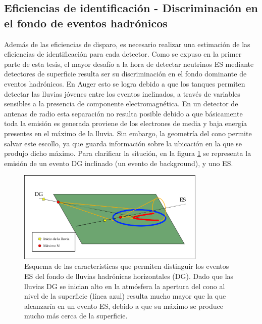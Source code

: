 	\clearpage
	\subsection{Eficiencias de identificaci\'on - Discriminaci\'on en el fondo de eventos hadr\'onicos}
	\label{sc:identificacionRadio}
	
	Adem\'as de las eficiencias de disparo, es necesario realizar una estimaci\'on de las eficiencias de identificaci\'on para cada detector.
	Como se expuso en la primer parte de esta tesis, el mayor desaf\'io a la hora de detectar neutrinos ES mediante detectores de superficie resulta ser su discriminaci\'on en el fondo dominante de eventos hadr\'onicos.
	En Auger esto se logra debido a que los tanques \cher{} permiten detectar las lluvias j\'ovenes entre los eventos inclinados, a trav\'es de variables sensibles a la presencia de componente electromagn\'etica.
	En un detector de antenas de radio esta separaci\'on no resulta posible debido a que b\'asicamente toda la emisi\'on es generada proviene de los electrones de media y baja energ\'ia presentes en el m\'aximo de la lluvia.
	Sin embargo, la geometr\'ia del cono \cher{} permite salvar este escollo, ya que guarda informaci\'on sobre la ubicaci\'on en la que se produjo dicho m\'aximo.
	Para clarificar la situci\'on, en la figura \ref{fig:dg_vs_es_radio} se representa la emisi\'on de un evento DG inclinado (un evento de background), y uno ES.
	\begin{figure}[ht!]
		\centering
		\includegraphics[width=0.8\textwidth]{./fig/simulacionRadio/idRadio.png}
		\caption{\label{fig:dg_vs_es_radio}
		Esquema de las caracter\'isticas que permiten distinguir los eventos ES del fondo de lluvias hadr\'onicas horizontales (DG). Dado que las lluvias DG se inician alto en la atm\'osfera la apertura del cono \cher{} al nivel de la superficie (l\'inea azul) resulta mucho mayor que la que alcanzar\'ia en un evento ES, debido a que su m\'aximo se produce mucho m\'as cerca de la superficie.
		}
	\end{figure}
